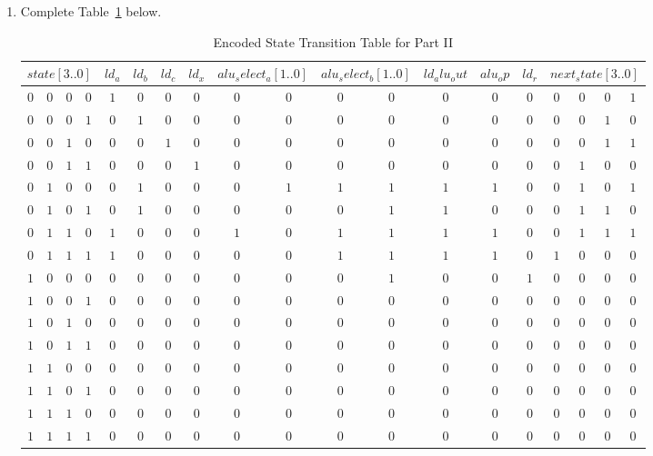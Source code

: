 \documentclass{article}
\begin{document}
\begin{enumerate}
\item Complete Table~\ref{t:part2_encoded_transition_table} below.

\begin{table}[ht!]
\caption{Encoded State Transition Table for Part II}
\label{t:part2_encoded_transition_table}
\centering
\begin{tabular}{cccc|ccccccccccccccc}
\multicolumn{4}{c|}{$state[3..0]$}&$ld_a$&$ld_b$&$ld_c$&$ld_x$&\multicolumn{2}{c}{$alu_select_a[1..0]$}&\multicolumn{2}{c}{$alu_select_b[1..0]$}&$ld_alu_out$&$alu_op$&$ld_r$&\multicolumn{4}{c}{$next_state[3..0]$}\\
\hline
$0$&$0$&$0$&$0$&$1$&$0$&$0$&$0$&$0$&$0$&$0$&$0$&$0$&$0$&$0$&$0$&$0$&$0$&$1$\\
$0$&$0$&$0$&$1$&$0$&$1$&$0$&$0$&$0$&$0$&$0$&$0$&$0$&$0$&$0$&$0$&$0$&$1$&$0$\\
$0$&$0$&$1$&$0$&$0$&$0$&$1$&$0$&$0$&$0$&$0$&$0$&$0$&$0$&$0$&$0$&$0$&$1$&$1$\\
$0$&$0$&$1$&$1$&$0$&$0$&$0$&$1$&$0$&$0$&$0$&$0$&$0$&$0$&$0$&$0$&$1$&$0$&$0$\\
$0$&$1$&$0$&$0$&$0$&$1$&$0$&$0$&$0$&$1$&$1$&$1$&$1$&$1$&$0$&$0$&$1$&$0$&$1$\\
$0$&$1$&$0$&$1$&$0$&$1$&$0$&$0$&$0$&$0$&$0$&$1$&$1$&$0$&$0$&$0$&$1$&$1$&$0$\\
$0$&$1$&$1$&$0$&$1$&$0$&$0$&$0$&$1$&$0$&$1$&$1$&$1$&$1$&$0$&$0$&$1$&$1$&$1$\\
$0$&$1$&$1$&$1$&$1$&$0$&$0$&$0$&$0$&$0$&$1$&$1$&$1$&$1$&$0$&$1$&$0$&$0$&$0$\\
$1$&$0$&$0$&$0$&$0$&$0$&$0$&$0$&$0$&$0$&$0$&$1$&$0$&$0$&$1$&$0$&$0$&$0$&$0$\\
$1$&$0$&$0$&$1$&$0$&$0$&$0$&$0$&$0$&$0$&$0$&$0$&$0$&$0$&$0$&$0$&$0$&$0$&$0$\\
$1$&$0$&$1$&$0$&$0$&$0$&$0$&$0$&$0$&$0$&$0$&$0$&$0$&$0$&$0$&$0$&$0$&$0$&$0$\\
$1$&$0$&$1$&$1$&$0$&$0$&$0$&$0$&$0$&$0$&$0$&$0$&$0$&$0$&$0$&$0$&$0$&$0$&$0$\\
$1$&$1$&$0$&$0$&$0$&$0$&$0$&$0$&$0$&$0$&$0$&$0$&$0$&$0$&$0$&$0$&$0$&$0$&$0$\\
$1$&$1$&$0$&$1$&$0$&$0$&$0$&$0$&$0$&$0$&$0$&$0$&$0$&$0$&$0$&$0$&$0$&$0$&$0$\\
$1$&$1$&$1$&$0$&$0$&$0$&$0$&$0$&$0$&$0$&$0$&$0$&$0$&$0$&$0$&$0$&$0$&$0$&$0$\\
$1$&$1$&$1$&$1$&$0$&$0$&$0$&$0$&$0$&$0$&$0$&$0$&$0$&$0$&$0$&$0$&$0$&$0$&$0$\\


\end{tabular}
\end{table}
\end{enumerate}
\end{document}
